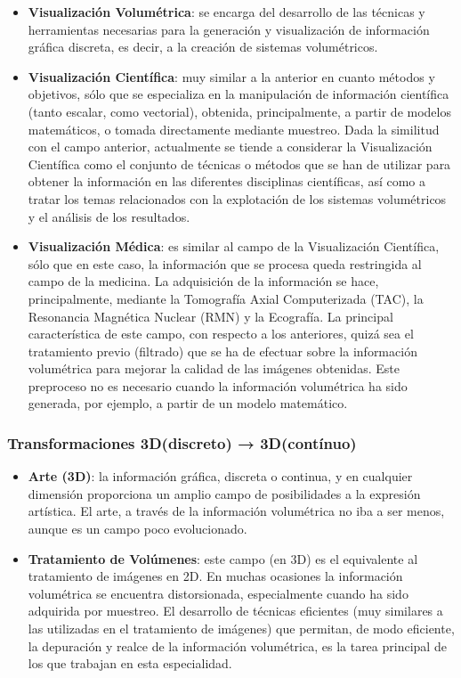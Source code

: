 \begin{itemize}
    \item \textbf{Visualización Volumétrica}: se encarga del desarrollo de las técnicas y herramientas necesarias para la generación y visualización de información gráfica discreta, es decir, a la creación de sistemas volumétricos.
    \item \textbf{Visualización Científica}: muy similar a la anterior en cuanto métodos y objetivos, sólo que se especializa en la manipulación de información científica (tanto escalar, como vectorial), obtenida, principalmente, a partir de modelos matemáticos, o tomada directamente mediante muestreo. Dada la similitud con el campo anterior, actualmente se tiende a considerar la Visualización Científica como el conjunto de técnicas o métodos que se han de utilizar para obtener la información en las diferentes disciplinas científicas, así como a tratar los temas relacionados con la explotación de los sistemas volumétricos y el análisis de los resultados.
    \item \textbf{Visualización Médica}: es similar al campo de la Visualización Científica, sólo que en este caso, la información que se procesa queda restringida al campo de la medicina. La adquisición de la información se hace, principalmente, mediante la Tomografía Axial Computerizada (TAC), la Resonancia Magnética Nuclear (RMN) y la Ecografía. La principal característica de este campo, con respecto a los anteriores, quizá sea el tratamiento previo (filtrado) que se ha de efectuar sobre la información volumétrica para mejorar la calidad de las imágenes obtenidas. Este preproceso no es necesario cuando la información volumétrica ha sido generada, por ejemplo, a partir de un modelo matemático.
    
\end{itemize}

\subsubsection{Transformaciones 3D(discreto) → 3D(contínuo)}
\begin{itemize}
    \item \textbf{Arte (3D)}: la información gráfica, discreta o continua, y en cualquier dimensión proporciona un amplio campo de posibilidades a la expresión artística. El arte, a través de la información volumétrica no iba a ser menos, aunque es un campo poco evolucionado.
    
    \item \textbf{Tratamiento de Volúmenes}: este campo (en 3D) es el equivalente al tratamiento de imágenes en 2D. En muchas ocasiones la información volumétrica se encuentra distorsionada, especialmente cuando ha sido adquirida por muestreo. El desarrollo de técnicas eficientes (muy similares a las utilizadas en el tratamiento de imágenes) que permitan, de modo eficiente, la depuración y realce de la información volumétrica, es la tarea principal de los que trabajan en esta especialidad.
\end{itemize}

